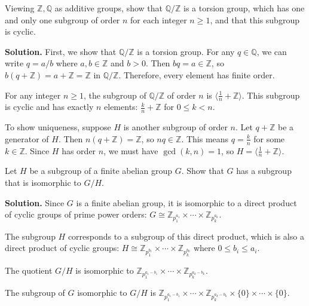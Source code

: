 \begin{problembox}
Viewing $\mathbb{Z}, \mathbb{Q}$ as additive groups, show that $\mathbb{Q}/\mathbb{Z}$ is a torsion group, which has one and only one subgroup of order $n$ for each integer $n \geq 1$, and that this subgroup is cyclic.
\end{problembox}

\noindent\textbf{Solution.} First, we show that $\mathbb{Q}/\mathbb{Z}$ is a torsion group. For any $q \in \mathbb{Q}$, we can write $q = a/b$ where $a, b \in \mathbb{Z}$ and $b > 0$. Then $bq = a \in \mathbb{Z}$, so $b(q + \mathbb{Z}) = a + \mathbb{Z} = \mathbb{Z}$ in $\mathbb{Q}/\mathbb{Z}$. Therefore, every element has finite order.

For any integer $n \geq 1$, the subgroup of $\mathbb{Q}/\mathbb{Z}$ of order $n$ is $\langle \frac{1}{n} + \mathbb{Z} \rangle$. This subgroup is cyclic and has exactly $n$ elements: $\frac{k}{n} + \mathbb{Z}$ for $0 \leq k < n$.

To show uniqueness, suppose $H$ is another subgroup of order $n$. Let $q + \mathbb{Z}$ be a generator of $H$. Then $n(q + \mathbb{Z}) = \mathbb{Z}$, so $nq \in \mathbb{Z}$. This means $q = \frac{k}{n}$ for some $k \in \mathbb{Z}$. Since $H$ has order $n$, we must have $\gcd(k, n) = 1$, so $H = \langle \frac{1}{n} + \mathbb{Z} \rangle$.

\begin{problembox}
Let $H$ be a subgroup of a finite abelian group $G$. Show that $G$ has a subgroup that is isomorphic to $G/H$.
\end{problembox}

\noindent\textbf{Solution.} Since $G$ is a finite abelian group, it is isomorphic to a direct product of cyclic groups of prime power orders: $G \cong \mathbb{Z}_{p_1^{a_1}} \times \cdots \times \mathbb{Z}_{p_k^{a_k}}$.

The subgroup $H$ corresponds to a subgroup of this direct product, which is also a direct product of cyclic groups: $H \cong \mathbb{Z}_{p_1^{b_1}} \times \cdots \times \mathbb{Z}_{p_k^{b_k}}$ where $0 \leq b_i \leq a_i$.

The quotient $G/H$ is isomorphic to $\mathbb{Z}_{p_1^{a_1-b_1}} \times \cdots \times \mathbb{Z}_{p_k^{a_k-b_k}}$.

The subgroup of $G$ isomorphic to $G/H$ is $\mathbb{Z}_{p_1^{a_1-b_1}} \times \cdots \times \mathbb{Z}_{p_k^{a_k-b_k}} \times \{0\} \times \cdots \times \{0\}$.

